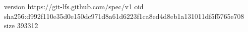 version https://git-lfs.github.com/spec/v1
oid sha256:d992f110e35d0e150dc971d8a61d6223f1ca8ed4d8eb1a131011df5f5765e708
size 393312
